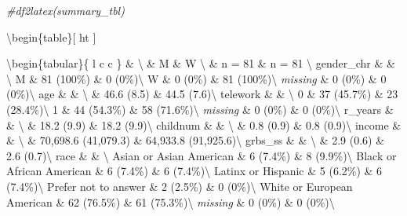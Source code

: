 \documentclass[
]{article}
\newenvironment{Shaded}{\begin{snugshade}}{\end{snugshade}}
\newcommand{\CommentTok}[1]{\textcolor[rgb]{0.56,0.35,0.01}{\textit{#1}}}
\begin{document}
\begin{Shaded}
\begin{Highlighting}[]
\CommentTok{\#df2latex(summary\_tbl)}
\end{Highlighting}
\end{Shaded}

\textbackslash begin\{table\}{[} ht {]} \centering 

\caption{}\label{}

\textbackslash begin\{tabular\}\{ l c c \} \toprule \&
\textbackslash{} \& M \& W
\textbackslash{} \& n = 81 \& n = 81 \textbackslash{} \midrule
gender\_chr \& \& \textbackslash{} \hspace{6pt} M \& 81 (100\%) \& 0
(0\%)\textbackslash{} \hspace{6pt} W \& 0 (0\%) \& 81
(100\%)\textbackslash{} \hspace{6pt} \emph{missing} \& 0 (0\%) \& 0
(0\%)\textbackslash{} age \& \& \textbackslash{} \hspace{6pt} \& 46.6
(8.5) \& 44.5 (7.6)\textbackslash{} telework \& \& \textbackslash{}
\hspace{6pt} 0 \& 37 (45.7\%) \& 23 (28.4\%)\textbackslash{}
\hspace{6pt} 1 \& 44 (54.3\%) \& 58 (71.6\%)\textbackslash{}
\hspace{6pt} \emph{missing} \& 0 (0\%) \& 0 (0\%)\textbackslash{}
r\_years \& \& \textbackslash{} \hspace{6pt} \& 18.2 (9.9) \& 18.2
(9.9)\textbackslash{} childnum \& \& \textbackslash{} \hspace{6pt} \&
0.8 (0.9) \& 0.8 (0.9)\textbackslash{} income \& \& \textbackslash{}
\hspace{6pt} \& 70,698.6 (41,079.3) \& 64,933.8
(91,925.6)\textbackslash{} grbs\_ss \& \& \textbackslash{} \hspace{6pt}
\& 2.9 (0.6) \& 2.6 (0.7)\textbackslash{} race \& \& \textbackslash{}
\hspace{6pt} Asian or Asian American \& 6 (7.4\%) \& 8
(9.9\%)\textbackslash{} \hspace{6pt} Black or African American \& 6
(7.4\%) \& 6 (7.4\%)\textbackslash{} \hspace{6pt} Latinx or Hispanic \&
5 (6.2\%) \& 6 (7.4\%)\textbackslash{} \hspace{6pt} Prefer not to answer
\& 2 (2.5\%) \& 0 (0\%)\textbackslash{} \hspace{6pt} White or European
American \& 62 (76.5\%) \& 61 (75.3\%)\textbackslash{} \hspace{6pt}
\emph{missing} \& 0 (0\%) \& 0 (0\%)\textbackslash{}
\end{document}
